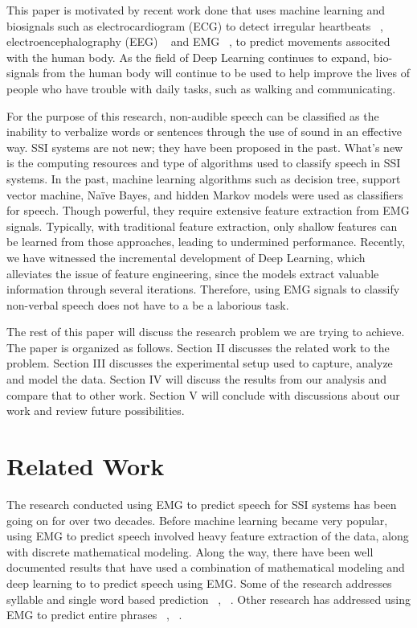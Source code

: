 \documentclass[conference]{IEEEtran}
\begin{document}
This paper is motivated by recent work done that uses machine learning
and biosignals such as electrocardiogram (ECG) to detect irregular heartbeats
~\cite{noauthor_classify_nodate}, electroencephalography (EEG) ~\cite{eltvik_deep_nodate}
and EMG ~\cite{altamirano_emg_nodate}, to predict movements associted with the human body.
As the field of Deep Learning continues to expand, bio-signals from the human body
will continue to be used to help improve the lives of people who have trouble
with daily tasks, such as walking and communicating.

For the purpose of this research, non-audible speech can be classified as the
inability to verbalize words or sentences through the use of sound in an effective way.
SSI systems are not new; they have been proposed in the past. What’s new is the
computing resources and type of algorithms used to classify speech in SSI systems.
In the past, machine learning algorithms such as decision tree, support vector
machine, Naïve Bayes, and hidden Markov models were used as classifiers for speech.
Though powerful, they require extensive feature extraction from EMG signals.
Typically, with traditional feature extraction, only shallow features can be learned from those
approaches, leading to undermined performance. Recently, we have witnessed the
incremental development of Deep Learning, which alleviates the issue of feature engineering,
since the models extract valuable information through several iterations. Therefore,
using EMG signals to classify non-verbal speech does not have to a be a laborious task.

The rest of this paper will discuss the research problem we are trying to achieve.
The paper is organized as follows. Section II discusses the related work to the problem.
Section III discusses the experimental setup used to capture, analyze and model the data.
Section IV will discuss the results from our analysis and compare that to other work.
Section V will conclude with discussions about our work and review future possibilities.

\section{Related Work}
The research conducted using EMG to predict speech for SSI systems has been going
on for over two decades. Before machine learning became very popular, using
EMG to predict speech involved heavy feature extraction of the data, along with
discrete mathematical modeling. Along the way, there have been well documented results
that have used a combination of mathematical modeling and deep learning to to predict
speech using EMG. Some of the research addresses syllable and single word based prediction
~\cite{lopez-larraz_syllable-based_2010}, ~\cite{maier-hein_session_2005}. Other research
has addressed using EMG to predict entire phrases ~\cite{janke_emg--speech:_2017},
~\cite{kapur_alterego:_2018}.
\end{document}
